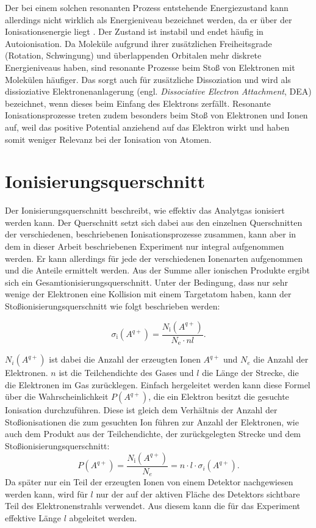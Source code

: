 Der bei einem solchen resonanten Prozess entstehende Energiezustand kann allerdings nicht wirklich als Energieniveau bezeichnet werden, da er über der Ionisationsenergie liegt \cite{EII}. Der Zustand ist instabil und endet häufig in Autoionisation. Da Moleküle aufgrund ihrer zusätzlichen Freiheitsgrade (Rotation, Schwingung) und überlappenden Orbitalen mehr diskrete Energieniveaus haben, sind resonante Prozesse beim Stoß von Elektronen mit Molekülen häufiger. Das sorgt auch für zusätzliche Dissoziation und wird als dissioziative Elektronenanlagerung (engl. \textit{Dissociative Electron Attachment}, DEA) bezeichnet, wenn dieses beim Einfang des Elektrons zerfällt. Resonante Ionisationsprozesse treten zudem besonders beim Stoß von Elektronen und Ionen auf, weil das positive Potential anziehend auf das Elektron wirkt und haben somit weniger Relevanz bei der Ionisation von Atomen.

\section{Ionisierungsquerschnitt}
Der Ionisierungsquerschnitt beschreibt, wie effektiv das Analytgas ionisiert werden kann. Der Querschnitt setzt sich dabei aus den einzelnen Querschnitten der verschiedenen, beschriebenen Ionisationsprozesse zusammen, kann aber in dem in dieser Arbeit beschriebenen Experiment nur integral aufgenommen werden. Er kann allerdings für jede der verschiedenen Ionenarten aufgenommen und die Anteile ermittelt werden. Aus der Summe aller ionischen Produkte ergibt sich ein Gesamtionisierungsquerschnitt. Unter der Bedingung, dass nur sehr wenige der Elektronen eine Kollision mit einem Targetatom haben, kann der Stoßionisierungsquerschnitt wie folgt beschrieben werden:

\begin{equation}
    \sigma_{\text{i}}(A^{q+}) = \frac{N_{\text{i}}(A^{q+})}{N_{\text{e}} \cdot n l}.
\end{equation}

$N_i(A^{q+})$ ist dabei die Anzahl der erzeugten Ionen $A^{q+}$ und $N_e$ die Anzahl der Elektronen. $n$ ist die Teilchendichte des Gases und $l$ die Länge der Strecke, die die Elektronen im Gas zurücklegen. Einfach hergeleitet werden kann diese Formel über die Wahrscheinlichkeit $P(A^{q+})$, die ein Elektron besitzt die gesuchte Ionisation durchzuführen. Diese ist gleich dem Verhältnis der Anzahl der Stoßionisationen die zum gesuchten Ion führen zur Anzahl der Elektronen, wie auch dem Produkt aus der Teilchendichte, der zurückgelegten Strecke und dem Stoßionisierungsquerschnitt: 
\begin{equation}
    P(A^{q+}) = \frac{N_{\text{i}}(A^{q+})}{N_e} = n \cdot l \cdot \sigma_i(A^{q+}).
\end{equation}
Da später nur ein Teil der erzeugten Ionen von einem Detektor nachgewiesen werden kann, wird für $l$ nur der auf der aktiven Fläche des Detektors sichtbare Teil des Elektronenstrahls verwendet. Aus diesem kann die für das Experiment effektive Länge $l$ abgeleitet werden.

